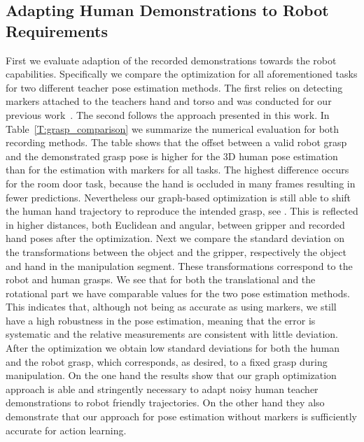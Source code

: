 \subsection{Adapting Human Demonstrations to Robot Requirements}
First we evaluate adaption of the recorded demonstrations towards the robot capabilities. Specifically we compare the optimization for all aforementioned tasks for two different teacher pose estimation methods. The first relies on detecting markers attached to the teachers hand and torso and was conducted for our previous work~\cite{twelsche17iros}. The second follows the approach presented in this work. In Table~\ref{T:grasp_comparison} we summarize the numerical evaluation for both recording methods. The table shows that the offset between a valid robot grasp and the demonstrated grasp pose is higher for the 3D human pose estimation than for the estimation with markers for all tasks. The highest difference occurs for the room door task, because the hand is occluded in many frames resulting in fewer predictions. Nevertheless our graph-based optimization is still able to shift the human hand trajectory to reproduce the intended grasp, see . This is reflected in higher distances, both Euclidean and angular, between gripper and recorded hand poses after the optimization. Next we compare the standard deviation on the transformations between the object and the gripper, respectively the object and hand in the manipulation segment. These transformations correspond to the robot and human grasps. We see that for both the translational and the rotational part we have comparable values for the two pose estimation methods. This indicates that, although not being as accurate as using markers, we still have a high robustness in the pose estimation, meaning that the error is systematic and the relative measurements are consistent with little deviation. After the optimization we obtain low standard deviations for both the human and the robot grasp, which corresponds, as desired, to a fixed grasp during manipulation. On the one hand the results show that our graph optimization approach is able and stringently necessary to adapt noisy human teacher demonstrations to robot friendly trajectories. On the other hand they also demonstrate that our approach for pose estimation without markers is sufficiently accurate for action learning.



